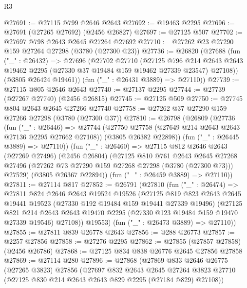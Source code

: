 \begin{lexlean}{R3}
\begin{coremodule}
@27691 := @27115 @799 @2646 @2643
@27692 := @19463 @2295
@27696 := @27691 (@27265 @27692) (@2456 @26827)
@27697 := @27125 @507
@27702 := @27697 @798 @2643 @2645 @27264 @27692
@27710 := @27262 @23 @27290 @159 @27264 @27298 (@3780 (@27300 @23))
@27736 := @26820
    (@27688
      (fun ("_" : @26432) =>
      @27696
        (@27702
          @27710
          (@27125
            @796
            @214
            @2643
            @2643
            @19462
            @2295
            (@27330 @37 @19484 @159 @19462 @27339 @23547)
            @27108))
        (@3805 @26424 @19461))
      (fun ("_" : @26431 @3889) => @27110))
@27739 := @27115 @805 @2646 @2643
@27740 := @27137 @2295
@27744 := @27739 (@27267 @27740) (@2456 @26815)
@27745 := @27125 @509
@27750 := @27745 @804 @2643 @2645 @27266 @27740
@27758 := @27262 @37 @27290 @159 @27266 @27298 (@3780 (@27300 @37))
@27810 := @26798
    (@26809
      (@27736
        (fun ("_" : @26446) =>
        @27744
          (@27750 @27758 (@27649 @214 @2643 @2643 @27136 @2295 @27662 @27108))
          (@3805 @26382 @22898))
        (fun ("_" : @26445 @3889) => @27110))
      (fun ("_" : @26460) =>
      @27115
        @812
        @2646
        @2643
        (@27269 @27496)
        (@2456 @26804)
        (@27125
          @810
          @761
          @2643
          @2645
          @27268
          @27496
          (@27262 @73 @27290 @159 @27268 @27298 (@3780 (@27300 @73)))
          @27529)
        (@3805 @26367 @22894))
      (fun ("_" : @26459 @3889) => @27110))
@27811 := @27114 @817
@27852 := @26791
    (@27810
      (fun ("_" : @26474) =>
      @27811
        @824
        @2646
        @2643
        @19524
        @19526
        (@27125
          @819
          @823
          @2643
          @2645
          @19441
          @19523
          (@27330 @192 @19484 @159 @19441 @27339 @19496)
          (@27125
            @821
            @214
            @2643
            @2643
            @19470
            @2295
            (@27330 @123 @19484 @159 @19470 @27339 @19546)
            @27108))
        @19553)
      (fun ("_" : @26473 @3889) => @27110))
@27855 := @27811 @839 @26778 @2643
@27856 := @288 @26773
@27857 := @2257 @27856
@27858 := @27276 @2295
@27862 := @27855 (@27857 @27858) (@2456 @26786)
@27868 := @27125 @834 @838 @26776 @2645 @27856 @27858
@27869 := @27114 @280
@27896 := @27868
    (@27869
      @833
      @2646
      @26775
      (@27265 @3823)
      @27856
      (@27697
        @832
        @2643
        @2645
        @27264
        @3823
        @27710
        (@27125 @830 @214 @2643 @2643 @829 @2295 (@27184 @829) @27108))

\end{coremodule}
\end{lexlean}

